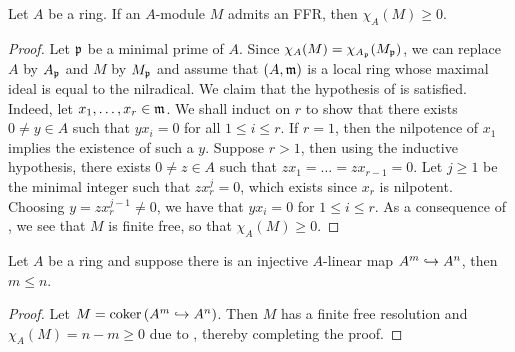\begin{theorem}
    Let $A$ be a ring. If an $A$-module $M$ admits an FFR, then $\chi_A(M)\ge 0$.
\end{theorem}
\begin{proof}
    Let $\mathfrak{p}$ be a minimal prime of $A$. Since $\chi_A(M) = \chi_{A_{\mathfrak{p}}}(M_{\mathfrak{p}})$, we can replace $A$ by $A_{\mathfrak{p}}$ and $M$ by $M_{\mathfrak{p}}$ and assume that $(A,\mathfrak{m})$ is a local ring whose maximal ideal is equal to the nilradical. We claim that the hypothesis of  is satisfied. Indeed, let $x_1,\dots,x_r\in\mathfrak{m}$. We shall induct on $r$ to show that there exists $0\ne y\in A$ such that $yx_i = 0$ for all $1\le i\le r$. If $r = 1$, then the nilpotence of $x_1$ implies the existence of such a $y$. Suppose $r > 1$, then using the inductive hypothesis, there exists $0\ne z\in A$ such that $zx_1 = \dots = zx_{r - 1} = 0$. Let $j\ge 1$ be the minimal integer such that $zx_r^j = 0$, which exists since $x_r$ is nilpotent. Choosing $y = zx_r^{j - 1}\ne 0$, we have that $yx_i = 0$ for $1\le i\le r$. As a consequence of , we see that $M$ is finite free, so that $\chi_A(M)\ge 0$.
\end{proof}

\begin{corollary}
    Let $A$ be a ring and suppose there is an injective $A$-linear map $A^m\hookrightarrow A^n$, then $m\le n$.
\end{corollary}
\begin{proof}
    Let $M = \operatorname{coker}\left(A^m\hookrightarrow A^n\right)$. Then $M$ has a finite free resolution and $\chi_A(M) = n - m\ge 0$ due to , thereby completing the proof.
\end{proof}

